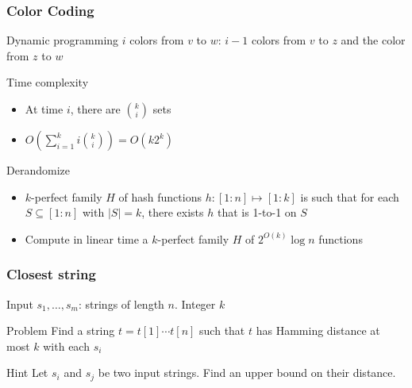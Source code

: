 \documentclass[12pt,aspectratio=169]{beamer}
\begin{document}
\begin{frame}\frametitle{Color Coding }
  \begin{block}{Dynamic programming}
    $i$ colors from $v$ to $w$:
    $i-1$ colors from $v$ to $z$ and the color from $z$ to $w$
  \end{block}

  \begin{block}{Time complexity}
    \begin{itemize}
      \item
    At time $i$, there are $k \choose i$ sets
  \item
    $O(\sum_{i=1}^{k} i {k \choose i}) = O(k 2^{k})$
  \end{itemize}
\end{block}
  \begin{block}{Derandomize}
    \begin{itemize}
    \item
      $k$-perfect family $H$ of hash functions $h:[1:n]\mapsto [1:k]$ is such that for
      each $S\subseteq [1:n]$ with $|S|=k$, there exists $h$ that is 1-to-1 on $S$
    \item
      Compute in linear time a $k$-perfect family $H$ of $2^{O(k)}\log n$ functions
    \end{itemize}
  \end{block}
\end{frame}

\begin{frame}\frametitle{Closest string }
    \begin{block}{Input}
      $s_{1}, \ldots, s_{m}$: strings of length $n$.
      Integer $k$
    \end{block}

    \begin{block}{Problem}
      Find a string $t=t[1]\cdots t[n]$ such that $t$ has Hamming distance at most $k$
      with each $s_{i}$
    \end{block}
     \begin{block}{Hint}
      Let $s_{i}$ and $s_{j}$ be two input strings.
Find an upper bound on their distance. 
    \end{block}
 \end{frame}
\end{document}
